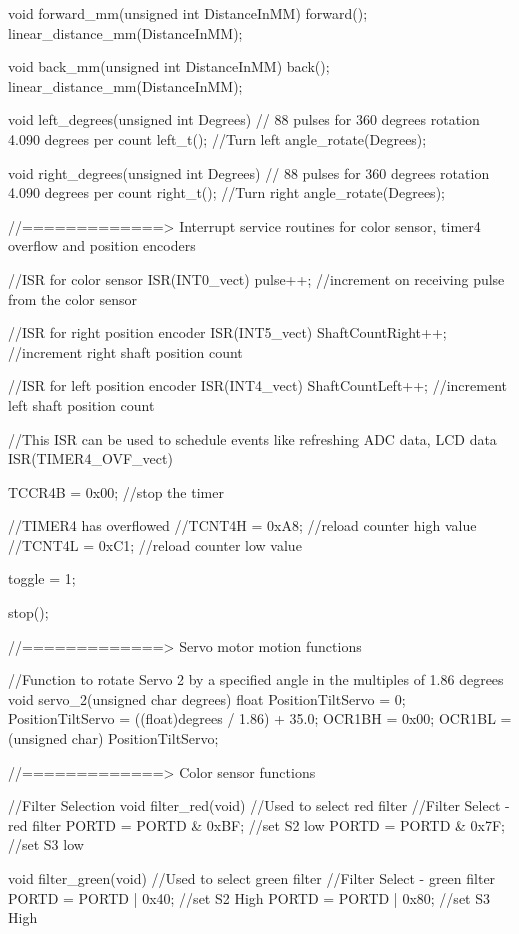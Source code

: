 void forward_mm(unsigned int DistanceInMM)
{
	forward();
	linear_distance_mm(DistanceInMM);
}

void back_mm(unsigned int DistanceInMM)
{
	back();
	linear_distance_mm(DistanceInMM);
}

void left_degrees(unsigned int Degrees)
{
	// 88 pulses for 360 degrees rotation 4.090 degrees per count
	left_t(); //Turn left
	angle_rotate(Degrees);
}

void right_degrees(unsigned int Degrees)
{
	// 88 pulses for 360 degrees rotation 4.090 degrees per count
	right_t(); //Turn right
	angle_rotate(Degrees);
}


//=============> Interrupt service routines for color sensor, timer4 overflow and position encoders

//ISR for color sensor
ISR(INT0_vect)
{
	pulse++; //increment on receiving pulse from the color sensor
}

//ISR for right position encoder
ISR(INT5_vect)
{
	ShaftCountRight++;  //increment right shaft position count
}

//ISR for left position encoder
ISR(INT4_vect)
{
	ShaftCountLeft++;  //increment left shaft position count
}

//This ISR can be used to schedule events like refreshing ADC data, LCD data
ISR(TIMER4_OVF_vect)
{
	TCCR4B = 0x00; //stop the timer
	
	//TIMER4 has overflowed
	//TCNT4H = 0xA8; //reload counter high value
	//TCNT4L = 0xC1; //reload counter low value
	
	toggle = 1;
	
	stop();

}


//=============> Servo motor motion functions

//Function to rotate Servo 2 by a specified angle in the multiples of 1.86 degrees
void servo_2(unsigned char degrees)
{
	float PositionTiltServo = 0;
	PositionTiltServo = ((float)degrees / 1.86) + 35.0;
	OCR1BH = 0x00;
	OCR1BL = (unsigned char) PositionTiltServo;
}


//=============> Color sensor functions

//Filter Selection
void filter_red(void)    //Used to select red filter
{
	//Filter Select - red filter
	PORTD = PORTD & 0xBF; //set S2 low
	PORTD = PORTD & 0x7F; //set S3 low
}

void filter_green(void)	//Used to select green filter
{
	//Filter Select - green filter
	PORTD = PORTD | 0x40; //set S2 High
	PORTD = PORTD | 0x80; //set S3 High
}

